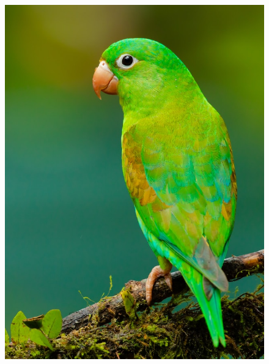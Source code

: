 \begin{figure}[ht]
  \centering
  \begin{minipage}[c]{0.33\linewidth}
    \centering
    \includegraphics[width=1.\linewidth]{images/hpcom/parrot3.jpg}
  \end{minipage}
  \begin{minipage}[c]{0.33\linewidth}
    \centering

\end{minipage}
\end{figure}
